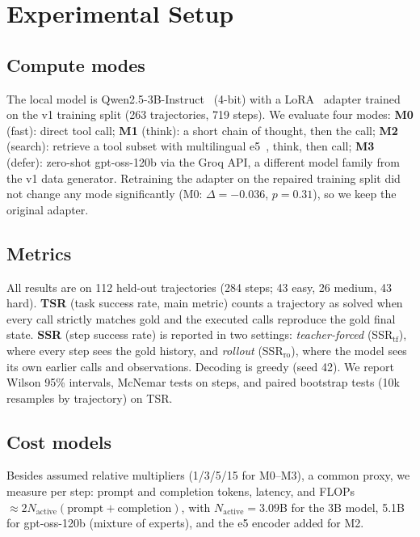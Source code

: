 \documentclass[conference,a4paper]{IEEEtran}
\begin{document}
\section{Experimental Setup}

\subsection{Compute modes}
The local model is Qwen2.5-3B-Instruct~\cite{qwen25} (4-bit) with a
LoRA~\cite{lora2021} adapter trained on the v1 training split (263
trajectories, 719 steps). We evaluate four modes:
\textbf{M0} (fast): direct tool call;
\textbf{M1} (think): a short chain of thought, then the call;
\textbf{M2} (search): retrieve a tool subset with multilingual
e5~\cite{e5multi2024}, think, then call;
\textbf{M3} (defer): zero-shot gpt-oss-120b via the Groq API, a different
model family from the v1 data generator. Retraining the adapter on the
repaired training split did not change any mode significantly (M0:
$\Delta=-0.036$, $p=0.31$), so we keep the original adapter.

\subsection{Metrics}
All results are on 112 held-out trajectories (284 steps; 43 easy, 26 medium,
43 hard). \textbf{TSR} (task success rate, main metric) counts a trajectory as
solved when every call strictly matches gold and the executed calls reproduce
the gold final state. \textbf{SSR} (step success rate) is reported in two
settings: \emph{teacher-forced} (SSR$_\text{tf}$), where every step sees the
gold history, and \emph{rollout} (SSR$_\text{ro}$), where the model sees its
own earlier calls and observations. Decoding is greedy (seed 42). We report
Wilson 95\% intervals, McNemar tests on steps, and paired bootstrap tests
(10k resamples by trajectory) on TSR.

\subsection{Cost models}
Besides assumed relative multipliers (1/3/5/15 for M0--M3), a common proxy,
we measure per step: prompt and completion tokens, latency, and FLOPs
$\approx 2N_\text{active}(\text{prompt}+\text{completion})$, with
$N_\text{active}=3.09$B for the 3B model, 5.1B for gpt-oss-120b (mixture of
experts), and the e5 encoder added for M2.
\end{document}
